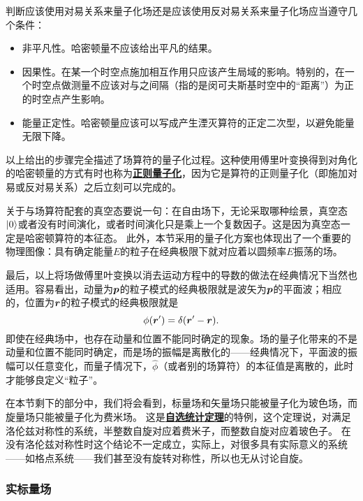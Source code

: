 \documentclass[hyperref, UTF8, a4paper]{ctexart}
\newcommand{\concept}[1]{\underline{\textbf{#1}}}
\begin{document}
判断应该使用对易关系来量子化场还是应该使用反对易关系来量子化场应当遵守几个条件：
\begin{itemize}
    \item 非平凡性。哈密顿量不应该给出平凡的结果。
    \item 因果性。在某一个时空点施加相互作用只应该产生局域的影响。特别的，在一个时空点做测量不应该对与之间隔（指的是闵可夫斯基时空中的“距离”）为正的时空点产生影响。
    \item 能量正定性。哈密顿量应该可以写成产生湮灭算符的正定二次型，以避免能量无限下降。
\end{itemize}

以上给出的步骤完全描述了场算符的量子化过程。这种使用傅里叶变换得到对角化的哈密顿量的方式有时也称为\concept{正则量子化}，因为它是算符的正则量子化（即施加对易或反对易关系）之后立刻可以完成的。

关于与场算符配套的真空态要说一句：在自由场下，无论采取哪种绘景，真空态$\ket{0}$或者没有时间演化，或者时间演化只是乘上一个复数因子。这是因为真空态一定是哈密顿算符的本征态。
此外，本节采用的量子化方案也体现出了一个重要的物理图像：具有确定能量$E$的粒子在经典极限下就对应着以圆频率$E$振荡的场。

最后，以上将场做傅里叶变换以消去运动方程中的导数的做法在经典情况下当然也适用。容易看出，动量为$\vb*{p}$的粒子模式的经典极限就是波矢为$\vb*{p}$的平面波；相应的，位置为$\vb*{r}$的粒子模式的经典极限就是
\[
    \phi(\vb*{r}') = \delta(\vb*{r}' - \vb*{r}).
\]
即使在经典场中，也存在动量和位置不能同时确定的现象。场的量子化带来的不是动量和位置不能同时确定，而是场的振幅是离散化的——经典情况下，平面波的振幅可以任意变化，而量子情况下，$\hat{\phi}$（或者别的场算符）的本征值是离散的，此时才能够良定义“粒子”。

在本节剩下的部分中，我们将会看到，标量场和矢量场只能被量子化为玻色场，而旋量场只能被量子化为费米场。
这是\concept{自选统计定理}的特例，这个定理说，对满足洛伦兹对称性的系统，半整数自旋对应着费米子，而整数自旋对应着玻色子。
在没有洛伦兹对称性时这个结论不一定成立，实际上，对很多具有实际意义的系统——如格点系统——我们甚至没有旋转对称性，所以也无从讨论自旋。

\subsubsection{实标量场}
\end{document}
